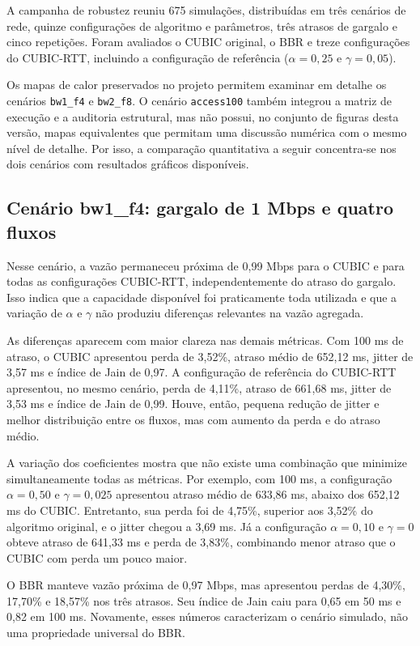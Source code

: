 A campanha de robustez reuniu 675 simulações, distribuídas em três cenários de rede, quinze configurações de algoritmo e parâmetros, três atrasos de gargalo e cinco repetições. Foram avaliados o CUBIC original, o BBR e treze configurações do CUBIC-RTT, incluindo a configuração de referência ($\alpha=0{,}25$ e $\gamma=0{,}05$).

Os mapas de calor preservados no projeto permitem examinar em detalhe os cenários \texttt{bw1\_f4} e \texttt{bw2\_f8}. O cenário \texttt{access100} também integrou a matriz de execução e a auditoria estrutural, mas não possui, no conjunto de figuras desta versão, mapas equivalentes que permitam uma discussão numérica com o mesmo nível de detalhe. Por isso, a comparação quantitativa a seguir concentra-se nos dois cenários com resultados gráficos disponíveis.

\subsection{Cenário bw1\_f4: gargalo de 1 Mbps e quatro fluxos}

Nesse cenário, a vazão permaneceu próxima de 0,99 Mbps para o CUBIC e para todas as configurações CUBIC-RTT, independentemente do atraso do gargalo. Isso indica que a capacidade disponível foi praticamente toda utilizada e que a variação de $\alpha$ e $\gamma$ não produziu diferenças relevantes na vazão agregada.

As diferenças aparecem com maior clareza nas demais métricas. Com 100 ms de atraso, o CUBIC apresentou perda de 3,52\%, atraso médio de 652,12 ms, jitter de 3,57 ms e índice de Jain de 0,97. A configuração de referência do CUBIC-RTT apresentou, no mesmo cenário, perda de 4,11\%, atraso de 661,68 ms, jitter de 3,53 ms e índice de Jain de 0,99. Houve, então, pequena redução de jitter e melhor distribuição entre os fluxos, mas com aumento da perda e do atraso médio.

A variação dos coeficientes mostra que não existe uma combinação que minimize simultaneamente todas as métricas. Por exemplo, com 100 ms, a configuração $\alpha=0{,}50$ e $\gamma=0{,}025$ apresentou atraso médio de 633,86 ms, abaixo dos 652,12 ms do CUBIC. Entretanto, sua perda foi de 4,75\%, superior aos 3,52\% do algoritmo original, e o jitter chegou a 3,69 ms. Já a configuração $\alpha=0{,}10$ e $\gamma=0$ obteve atraso de 641,33 ms e perda de 3,83\%, combinando menor atraso que o CUBIC com perda um pouco maior.

O BBR manteve vazão próxima de 0,97 Mbps, mas apresentou perdas de 4,30\%, 17,70\% e 18,57\% nos três atrasos. Seu índice de Jain caiu para 0,65 em 50 ms e 0,82 em 100 ms. Novamente, esses números caracterizam o cenário simulado, não uma propriedade universal do BBR.

